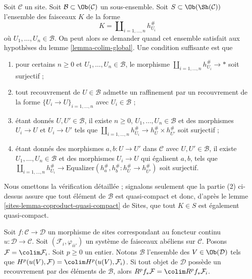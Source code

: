 \begin{remark}
\label{remark-colim-global}
Soit $\mathcal{C}$ un site. Soit $\mathcal{B} \subset \Ob(\mathcal{C})$
un sous-ensemble. Soit $S \subset \Ob(\Sh(\mathcal{C}))$
l'ensemble des faisceaux $K$ de la forme
$$
K = \coprod\nolimits_{i = 1, \ldots, n} h_{U_i}^\#
$$
où $U_1, \ldots, U_n \in \mathcal{B}$. On peut alors se demander quand cet
ensemble satisfait aux hypothèses du lemme \ref{lemma-colim-global}. Une
condition suffisante est que
\begin{enumerate}
\item pour certains $n \geq 0$ et $U_1, \ldots, U_n \in \mathcal{B}$,
le morphisme $\coprod_{i = 1, \ldots, n} h_{U_i}^\# \to *$ soit surjectif ;
\item tout recouvrement de $U \in \mathcal{B}$ admette un raffinement par un
recouvrement de la forme $\{U_i \to U\}_{i = 1, \ldots, n}$ avec
$U_i \in \mathcal{B}$ ;
\item étant donnés $U, U' \in \mathcal{B}$, il existe $n \geq 0$,
$U_1, \ldots, U_n \in \mathcal{B}$ et des morphismes $U_i \to U$ et
$U_i \to U'$ tels que $\coprod_{i = 1, \ldots, n} h_{U_i}^\# \to
h_U^\# \times h_{U'}^\#$ soit surjectif ;
\item étant donnés des morphismes $a, b : U \to U'$ dans $\mathcal{C}$ avec
$U, U' \in \mathcal{B}$, il existe $U_1, \ldots, U_n \in \mathcal{B}$ et
des morphismes $U_i \to U$ qui égalisent $a, b$, tels que
$\coprod_{i = 1, \ldots, n} h_{U_i}^\# \to
\text{Equalizer}(h_a^\#, h_b^\# : h_U^\# \to h_{U'}^\#)$
soit surjectif.
\end{enumerate}
Nous omettons la vérification détaillée ; signalons seulement que la partie
(2) ci-dessus assure que tout élément de $\mathcal{B}$ est quasi-compact et
donc, d'après le lemme \ref{sites-lemma-coproduct-quasi-compact} de Sites,
que tout $K \in S$ est également quasi-compact.
\end{remark}

\begin{lemma}
\label{lemma-higher-direct-image-colimit}
Soit $f : \mathcal{C} \to \mathcal{D}$ un morphisme de sites correspondant
au foncteur continu $u : \mathcal{D} \to \mathcal{C}$.
Soit $(\mathcal{F}_i, \varphi_{ii'})$ un système de faisceaux abéliens sur
$\mathcal{C}$. Posons $\mathcal{F} = \colim \mathcal{F}_i$.
Soit $p \geq 0$ un entier. Notons $\mathcal{B}$ l'ensemble des
$V \in \Ob(\mathcal{D})$ tels que
$H^p(u(V), \mathcal{F}) = \colim H^p(u(V), \mathcal{F}_i)$.
Si tout objet de $\mathcal{D}$ possède un recouvrement par des éléments de
$\mathcal{B}$, alors $R^pf_*\mathcal{F} = \colim R^pf_*\mathcal{F}_i$.
\end{lemma}

